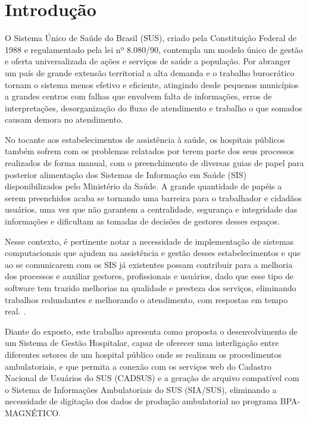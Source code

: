 \chapter{Introdução}
%
O Sistema Único de Saúde do Brasil (SUS), criado pela Constituição Federal de 1988 e regulamentado pela lei nº 8.080/90, contempla um modelo único de gestão e oferta universalizada de ações e serviços de saúde a população. Por abranger um país de grande extensão territorial a alta demanda e o trabalho burocrático tornam o sistema menos efetivo e eficiente, atingindo desde pequenos municípios a grandes centros com falhas que envolvem falta de informações, erros de interpretações, desorganização do fluxo de atendimento e trabalho o que somados causam demora no atendimento.

No tocante aos estabelecimentos de assistência à saúde, os hospitais públicos também sofrem com os problemas relatados por terem parte dos seus processos realizados de forma manual, com o preenchimento de diversas guias de papel para posterior alimentação dos Sistemas de Informação em Saúde (SIS) disponibilizados pelo Ministério da Saúde. A grande quantidade de papéis a serem preenchidos acaba se tornando uma barreira para o trabalhador e cidadãos usuários, uma vez que não garantem a centralidade, segurança e integridade das informações e dificultam as tomadas de decisões de gestores desses espaços.

Nesse contexto, é pertinente notar a necessidade de implementação de sistemas computacionais que ajudem na assistência e gestão desses estabelecimentos e que ao se comunicarem com os SIS já existentes possam contribuir para a melhoria dos processos e auxiliar gestores, profissionais e usuários, dado que esse tipo de software tem trazido melhorias na qualidade e presteza dos serviços, eliminando trabalhos redundantes e melhorando o atendimento, com respostas em tempo real. \cite{martinselaugeni}.

Diante do exposto, este trabalho apresenta como proposta o desenvolvimento de um Sistema de Gestão Hospitalar, capaz de oferecer uma interligação entre diferentes setores de um hospital público onde se realizam os procedimentos ambulatoriais, e que permita a conexão com os serviços web do Cadastro Nacional de Usuários do SUS (CADSUS) e a geração de arquivo compatível com o Sistema de Informações Ambulatoriais do SUS (SIA/SUS), eliminando a necessidade de digitação dos dados de produção ambulatorial no programa BPA-MAGNÉTICO.

